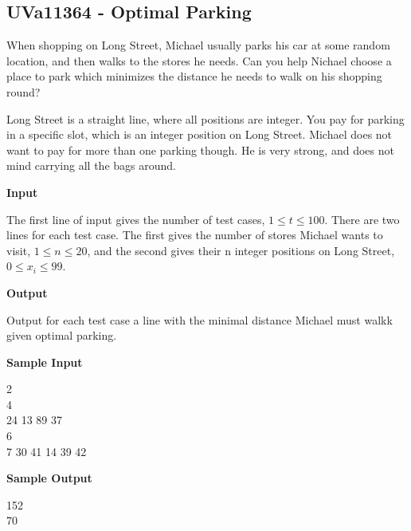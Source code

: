 \subsection{UVa11364 - Optimal Parking}
When shopping on Long Street, Michael usually parks his car at some random location, and then walks to the stores he needs. Can you help Nichael choose a place to park which minimizes the distance he needs to walk on his shopping round?

Long Street is a straight line, where all positions are integer. You pay for parking in a specific slot, which is an integer position on Long Street. Michael does not want to pay for more than one parking though. He is very strong, and does not mind carrying all the bags around.

\begin{flushleft}
{\color{red} \textbf{Input}}
\end{flushleft}
The first line of input gives the number of test cases, $1 \leq t \leq 100$. There are two lines for each test case. The first gives the number of stores Michael wants to visit, $1 \leq n \leq 20$, and the second gives their n integer positions on Long Street, $0 \leq x_i \leq 99$. 

\begin{flushleft}
{\color{red} \textbf{Output}}
\end{flushleft}
Output for each test case a line with the minimal distance Michael must walkk given optimal parking.

\begin{flushleft}
{\color{red} \textbf{Sample Input}}
\end{flushleft}
\begin{flushleft}
2\\
4\\
24 13 89 37\\
6\\
7 30 41 14 39 42\\
\end{flushleft}

\begin{flushleft}
{\color{red} \textbf{Sample Output}}
\end{flushleft}
\begin{flushleft}
152\\
70\\
\end{flushleft}

\newpage